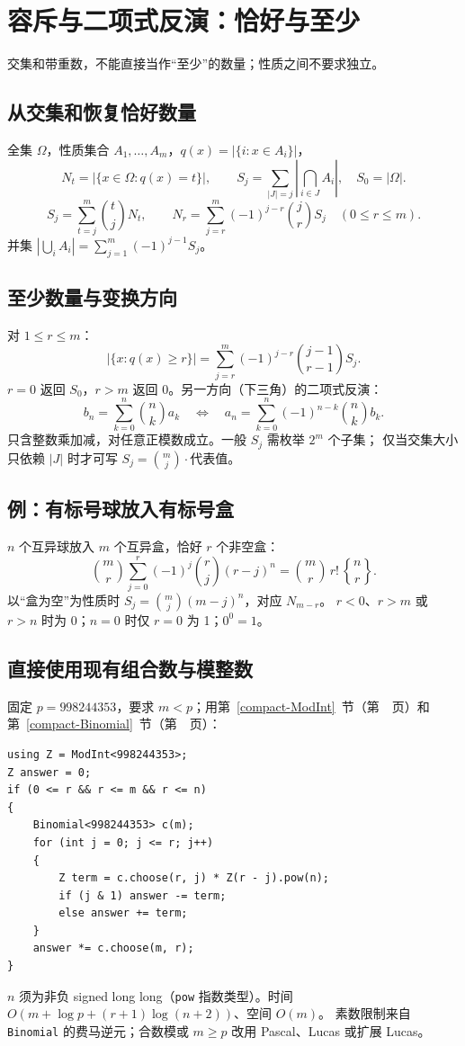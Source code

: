 \section{容斥与二项式反演：恰好与至少}\label{knowledge-inclusion-exact}
交集和带重数，不能直接当作“至少”的数量；性质之间不要求独立。

\subsection{从交集和恢复恰好数量}
全集 $\Omega$，性质集合 $A_1,\ldots,A_m$，$q(x)=|\{i:x\in A_i\}|$，
\[
N_t=|\{x\in\Omega:q(x)=t\}|,\qquad
S_j=\sum_{|J|=j}\left|\bigcap_{i\in J}A_i\right|,\quad S_0=|\Omega|.
\]
\[
\boxed{S_j=\sum_{t=j}^m\binom tjN_t,\qquad
N_r=\sum_{j=r}^m(-1)^{j-r}\binom jrS_j\quad(0\le r\le m).}
\]
并集 $|\bigcup_iA_i|=\sum_{j=1}^m(-1)^{j-1}S_j$。

\subsection{至少数量与变换方向}
对 $1\le r\le m$：
\[
\boxed{|\{x:q(x)\ge r\}|=
\sum_{j=r}^m(-1)^{j-r}\binom{j-1}{r-1}S_j.}
\]
$r=0$ 返回 $S_0$，$r>m$ 返回 0。另一方向（下三角）的二项式反演：
\[
b_n=\sum_{k=0}^n\binom nk a_k
\quad\Longleftrightarrow\quad
 a_n=\sum_{k=0}^n(-1)^{n-k}\binom nk b_k.
\]
只含整数乘加减，对任意正模数成立。一般 $S_j$ 需枚举 $2^m$ 个子集；
仅当交集大小只依赖 $|J|$ 时才可写 $S_j=\binom mj\cdot$代表值。

\subsection{例：有标号球放入有标号盒}
$n$ 个互异球放入 $m$ 个互异盒，恰好 $r$ 个非空盒：
\[
\boxed{\binom mr\sum_{j=0}^r(-1)^j\binom rj(r-j)^n
=\binom mr\,r!\,\genfrac{\{}{\}}{0pt}{}{n}{r}.}
\]
以“盒为空”为性质时 $S_j=\binom mj(m-j)^n$，对应 $N_{m-r}$。
$r<0$、$r>m$ 或 $r>n$ 时为 0；$n=0$ 时仅 $r=0$ 为 1；$0^0=1$。

\subsection{直接使用现有组合数与模整数}
固定 $p=998244353$，要求 $m<p$；用第~\ref{compact-ModInt}~节（第~\pageref{compact-ModInt}~页）和
第~\ref{compact-Binomial}~节（第~\pageref{compact-Binomial}~页）：
\begin{lstlisting}
using Z = ModInt<998244353>;
Z answer = 0;
if (0 <= r && r <= m && r <= n)
{
    Binomial<998244353> c(m);
    for (int j = 0; j <= r; j++)
    {
        Z term = c.choose(r, j) * Z(r - j).pow(n);
        if (j & 1) answer -= term;
        else answer += term;
    }
    answer *= c.choose(m, r);
}
\end{lstlisting}
$n$ 须为非负 signed long long（\texttt{pow} 指数类型）。时间 $O(m+\log p+(r+1)\log(n+2))$、空间 $O(m)$。
素数限制来自 \texttt{Binomial} 的费马逆元；合数模或 $m\ge p$ 改用 Pascal、Lucas 或扩展 Lucas。
